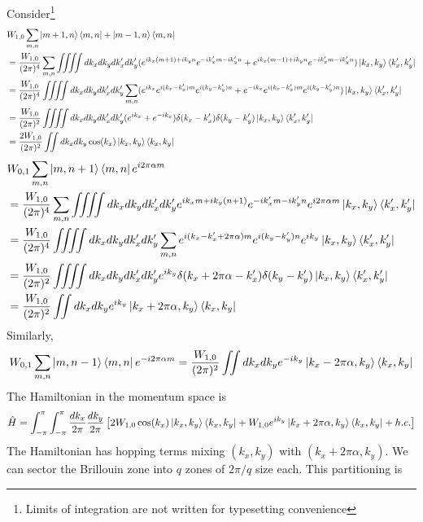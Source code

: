 Consider\footnote{Limits of integration are not written for typesetting convenience}
\begin{align*}
 &W_{1,0} \sum_{m, n} \ket{m+1,n}\bra{m,n} + \ket{m-1,n}\bra{m,n}\nonumber\\ 
 &= \frac{W_{1,0}}{(2\pi)^4}\sum_{m,n}\iiiint dk_{x}dk_{y}dk_{x}'dk_{y}'(e^{ik_x(m+1)+ik_yn}e^{-ik_x'm-ik_y'n} + e^{ik_x(m-1)+ik_yn}e^{-ik_x'm-ik_y'n})\ket{k_x,k_y}\bra{k_{x}',k_{y}'} \nonumber\\
 &= \frac{W_{1,0}}{(2\pi)^4}\iiiint dk_{x}dk_{y}dk_{x}'dk_{y}'\sum_{m,n}(e^{ik_x}e^{i(k_x-k_x')m}e^{i(k_y-k_y')n} + e^{-ik_x}e^{i(k_x-k_x')m}e^{i(k_y-k_y')n})\ket{k_x,k_y}\bra{k_{x}',k_{y}'} \nonumber \\
 &=\frac{W_{1,0}}{(2\pi)^2}\iiiint dk_{x}dk_{y}dk_{x}'dk_{y}'(e^{ik_x}+e^{-ik_x}) \delta(k_x-k_x') \delta(k_y-k_y')\ket{k_x,k_y}\bra{k_{x}',k_{y}'} \nonumber \\
 &= \frac{2W_{1,0}}{(2\pi)^2} \iint dk_{x}dk_{y} \cos(k_x)\ket{k_x,k_y}\bra{k_{x},k_{y}}
\end{align*}
\begin{align*}
 &W_{0,1} \sum_{m, n}\ket{m, n+1}\bra{m, n} e^{i2\pi\alpha m} \\
 &= \frac{W_{1,0}}{(2\pi)^4}\sum_{m,n}\iiiint dk_{x}dk_{y}dk_{x}'dk_{y}'e^{ik_xm+ik_y(n+1)}e^{-ik_x'm-ik_y'n}e^{i2\pi\alpha m}\ket{k_x,k_y}\bra{k_{x}',k_{y}'}\\
 &= \frac{W_{1,0}}{(2\pi)^4}\iiiint dk_{x}dk_{y}dk_{x}'dk_{y}'\sum_{m,n}e^{i(k_x-k_x'+2\pi\alpha)m}e^{i(k_y-k_y')n}e^{ik_y}\ket{k_x,k_y}\bra{k_{x}',k_{y}'}\\
 &= \frac{W_{1,0}}{(2\pi)^2}\iiiint dk_{x}dk_{y}dk_{x}'dk_{y}' e^{ik_y} \delta(k_x+2\pi\alpha-k_x') \delta(k_y-k_y')\ket{k_x,k_y}\bra{k_{x}',k_{y}'}\\
 &= \frac{W_{1,0}}{(2\pi)^2}\iint dk_{x}dk_{y} e^{ik_y}\ket{k_x+2\pi\alpha,k_y}\bra{k_{x},k_{y}}\\
\end{align*}
Similarly,
\begin{equation*}
 W_{0,1} \sum_{m, n}\ket{m, n-1}\bra{m, n} e^{-i2\pi\alpha m} = \frac{W_{1,0}}{(2\pi)^2}\iint dk_{x}dk_{y} e^{-ik_y}\ket{k_x-2\pi\alpha,k_y}\bra{k_{x},k_{y}}
\end{equation*}
The Hamiltonian in the momentum space is 
\begin{equation}
 \hat{H} = \int_{-\pi}^{\pi}\int_{-\pi}^{\pi}{\frac{dk_{x}}{2\pi}\frac{dk_{y}}{2\pi} \left[ 2W_{1,0}\cos(k_{x}) \ket{k_x,k_y}\bra{k_{x},k_{y}} + W_{1,0}e^{ik_y}\ket{k_x+2\pi\alpha,k_y}\bra{k_{x},k_{y}} + h.c.\right]}
\end{equation} The Hamiltonian has hopping terms mixing $(k_x, k_y)$ with $(k_x + 2\pi\alpha, k_y)$. We can sector the Brillouin zone into $q$ zones of $2\pi/q$ size each. This partitioning is
